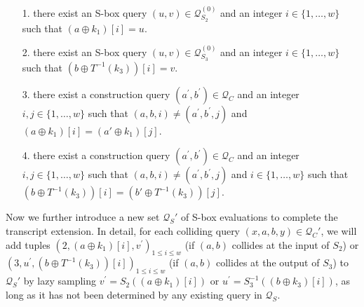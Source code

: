 \begin{itemize}
	\item[1.]
	there exist an S-box query $(u,v)\in\mathcal{Q}_{S_2}^{(0)}$ and an integer $i \in\{1, \ldots, w\}$ such that $\left(a \oplus k_1\right)[i]=u$.
	\item[2.]
	there exist an S-box query $(u,v)\in\mathcal{Q}_{S_3}^{(0)}$ and an integer $i \in\{1, \ldots, w\}$ such that $\left(b \oplus T^{-1}(k_3)\right)[i]=v$.
	\item[3.] there exist a construction query $\left(a^{\prime}, b^{\prime}\right) \in \mathcal{Q}_{C}$ and an integer $i,j \in\{1, \ldots, w\}$ such that $(a, b, i) \neq\left(a^{\prime}, b^{\prime}, j\right)$ and $\left(a \oplus k_1\right)[i] = \left(a' \oplus k_1\right)[j]$.
	\item[4.] there exist a construction query $\left(a^{\prime}, b^{\prime}\right) \in \mathcal{Q}_{C}$ and an integer $i,j \in\{1, \ldots, w\}$ such that $(a, b, i) \neq\left(a^{\prime}, b^{\prime}, j\right)$ and $i \in\{1, \ldots, w\}$ such that $\left(b \oplus T^{-1}(k_3)\right)[i] = \left(b' \oplus T^{-1}(k_3)\right)[j]$.
\end{itemize}
%
%
Now we further introduce a new set $\mathcal{Q}_{S}'$ of S-box evaluations to complete the transcript extension. In detail, for each colliding query $(x,a,b,y)\in\mathcal{Q}_C'$, we will add tuples $\left(2, (a \oplus k_1)[i], v^{\prime}\right)_{1 \leq i \leq w}$ (if $(a, b)$ collides at the input of $S_2$) or $\left(3, u^{\prime}, (b \oplus T^{-1}(k_3))[i]\right)_{1 \leq i \leq w}$ (if $(a, b)$ collides at the output of $S_3$) to $\mathcal{Q}_{S}'$ by lazy sampling $v^{\prime}=S_2(\left(a \oplus k_1\right)[i])$ or $u^{\prime}=S_3^{-1}(\left(b \oplus k_3\right)[i])$, as long as it has not been determined by any existing query in $\mathcal{Q}_S$.


